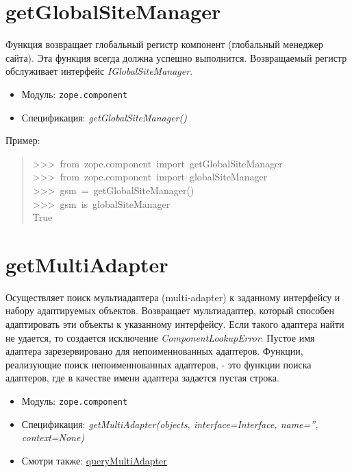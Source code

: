 \documentclass[a4paper,openany,twoside,final]{book}
\providecommand*{\DUroletitlereference}[1]{\textsl{#1}}
\begin{document}
\section*{getGlobalSiteManager%
  \label{getglobalsitemanager}%
}

Функция возвращает глобальный регистр компонент (глобальный менеджер
сайта).  Эта функция всегда должна успешно выполнится.  Возвращаемый
регистр обслуживает интерфейс \DUroletitlereference{IGlobalSiteManager}.

\begin{itemize}

\item Модуль: \texttt{zope.component}

\item Спецификация: \DUroletitlereference{getGlobalSiteManager()}

\end{itemize}

Пример:

\begin{quote}{\ttfamily \raggedright \noindent
>{}>{}>~from~zope.component~import~getGlobalSiteManager\\
>{}>{}>~from~zope.component~import~globalSiteManager\\
>{}>{}>~gsm~=~getGlobalSiteManager()\\
>{}>{}>~gsm~is~globalSiteManager\\
True
}
\end{quote}


\section*{getMultiAdapter%
  \label{getmultiadapter}%
}

Осуществляет поиск мультиадаптера (multi-adapter) к заданному
интерфейсу и набору адаптируемых объектов.  Возвращает мультиадаптер,
который способен адаптировать эти объекты к указанному интерфейсу.
Если такого адаптера найти не удается, то создается исключение
\DUroletitlereference{ComponentLookupError}.  Пустое имя адаптера зарезервировано для
непоименнованных адаптеров.  Функции, реализующие поиск
непоименнованных адаптеров, - это функции поиска адаптеров, где в
качестве имени адаптера задается пустая строка.

\begin{itemize}

\item Модуль: \texttt{zope.component}

\item Спецификация: \DUroletitlereference{getMultiAdapter(objects, interface=Interface, name='',
context=None)}

\item Смотри также: \hyperref[querymultiadapter]{queryMultiAdapter}

\end{itemize}
\end{document}
